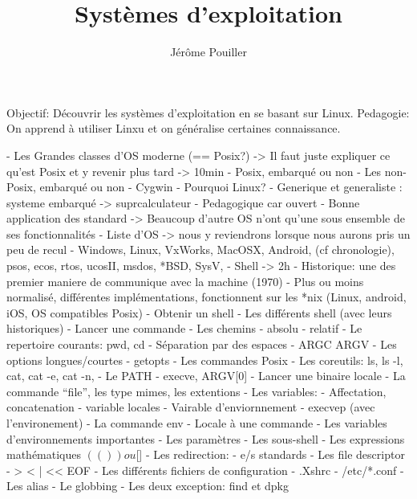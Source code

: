 \documentclass[10pt,ucs,usepdftitle=false]{beamer}
\title{Systèmes d'exploitation}
\author[Sysmic - J. Pouiller]{Jérôme Pouiller \email{j.pouiller@sysmic.org}}
\institute[Sysmic]{}
\date{}
\begin{document}
  \begin{frame}[plain]
    \maketitle
  \end{frame}

  Objectif: Découvrir les systèmes d'exploitation en se basant sur Linux.
  Pedagogie: On apprend à utiliser Linxu et on généralise certaines connaissance.

  - Les Grandes classes d'OS moderne (== Posix?) -> Il faut juste expliquer ce qu'est Posix et y revenir plus tard -> 10min
     - Posix, embarqué ou non
     - Les non-Posix, embarqué ou non
     - Cygwin
     - Pourquoi Linux? 
       - Generique et generaliste : systeme embarqué -> suprcalculateur
       - Pedagogique car ouvert
       - Bonne application des standard -> Beaucoup d'autre OS n'ont qu'une sous ensemble de ses fonctionnalités
    - Liste d'OS -> nous y reviendrons lorsque nous aurons pris un peu de recul
      - Windows, Linux, VxWorks, MacOSX, Android, (cf chronologie), psos, ecos, rtos, ucosII, msdos, *BSD, SysV, 
  - Shell -> 2h
    - Historique: une des premier maniere de communique avec la machine (1970)
    - Plus ou moins normalisé, différentes implémentations, fonctionnent sur les *nix (Linux, android, iOS, OS compatibles Posix)
    - Obtenir un shell
    - Les différents shell (avec leurs historiques)
    - Lancer une commande
    - Les chemins
      - absolu
      - relatif
      - Le repertoire courants: pwd, cd
    - Séparation par des espaces
      - ARGC ARGV
    - Les options longues/courtes
      - getopts
    - Les commandes Posix
    - Les coreutils: ls, ls -l, cat, cat -e, cat -n, 
    - Le PATH
      - execve, ARGV[0]
    - Lancer une binaire locale
    - La commande ``file'', les type mimes, les extentions
    - Les variables:
       - Affectation, concatenation
       - variable locales
       - Vairable d'enviornnement
         - execvep (avec l'environement)
         - La commande env
         - Locale à une commande
       - Les variables d'environnements importantes
       - Les paramètres
       - Les sous-shell
       - Les expressions mathématiques $(()) ou $[]
    - Les redirection: 
       - e/s standards
       - Les file descriptor
       - > < | << EOF
    - Les différents fichiers de configuration
       - .Xshrc
       - /etc/*.conf
    - Les alias
    - Le globbing
      - Les deux exception: find et dpkg
\end{document}
